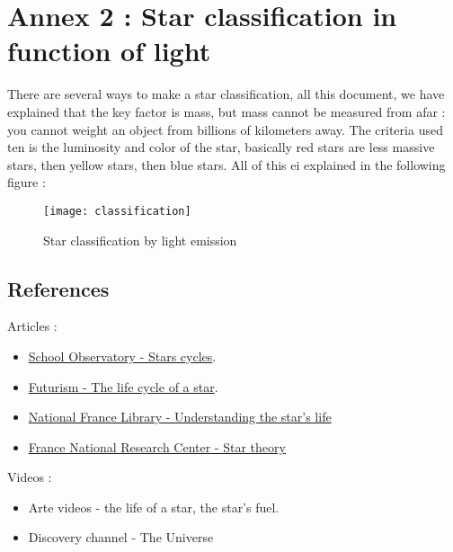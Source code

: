 \documentclass[a4paper, 11pt]{article} %
\begin{document}
\section*{Annex 2 : Star classification in function of light}

There are several ways to make a star classification, all this document, we have explained that the key factor is mass, but mass cannot be measured from afar : you cannot weight an object from billions of kilometers away. The criteria used ten is the luminosity and color of the star, basically red stars are less massive stars, then yellow stars, then blue stars. All of this ei explained in the following figure	 :

\begin{figure}[h]
\centering
\texttt{[image: classification]}
\caption{Star classification by light emission}
\end{figure}

\newpage

\subsection*{References}
Articles :
\begin{itemize}
\item \href{http://www.schoolsobservatory.org.uk/learn/astro/stars/cycle}{School Observatory - Stars cycles}.
\item \href{https://futurism.com/the-life-cycle-of-a-star/}{Futurism - The life cycle of a star}.
\item \href{http://expositions.bnf.fr/ciel/elf/page12.htm}{National France Library - Understanding the star's life}
\item \href{http://www.cnrs.fr/cw/dossiers/dosbig/decouv/xchrono/etoiles/niv1_1.htm}{France National Research Center - Star theory}
\end{itemize}

Videos :
\begin{itemize}
\item Arte videos - the life of a star, the star's fuel.
\item Discovery channel - The Universe
\end{itemize}

%

%

\end{document}
